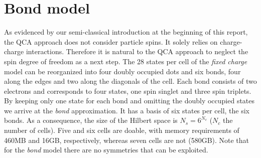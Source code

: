 \section{Bond model}

As evidenced by our semi-classical introduction at the beginning of this report,
the QCA approach does not consider particle spins. It solely relies on
charge-charge interactions. Therefore it is natural to the QCA approach to
neglect the spin degree of freedom as a next step. The 28 states per cell of the
\emph{fixed charge} model can be reorganized into four doubly occupied dots and
six bonds, four along the edges and two along the diagonals of the cell. Each
bond consists of two electrons and corresponds to four states, one spin singlet
and three spin triplets. By keeping only one state for each bond and omitting
the doubly occupied states we arrive at the \emph{bond} approximation. It has a
basis of six states per cell, the six bonds. As a consequence, the size of the
Hilbert space is $N_s = 6^{N_c}$ ($N_c$ the number of cells). Five and six cells
are doable, with memory requirements of 460MB and 16GB, respectively, whereas
seven cells are not (580GB). Note that for the \emph{bond} model there are no
symmetries that can be exploited. 

